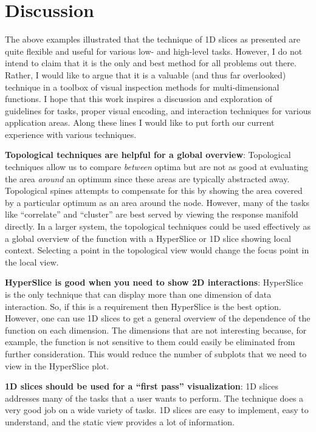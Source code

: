 
\section{Discussion}

The above examples illustrated that the technique of 1D slices as presented are
quite flexible and useful for various low- and high-level tasks.  However, I do
not intend to claim that it is the only and best method for all problems out
there. Rather, I would like to argue that it is a valuable (and thus far
overlooked) technique in a toolbox of visual inspection methods for
multi-dimensional functions. I hope that this work inspires a discussion and
exploration of guidelines for tasks, proper visual encoding, and interaction
techniques for various application areas. Along these lines I would like to put
forth our current experience with various techniques.

\textbf{Topological techniques are helpful for a global overview}: Topological
techniques allow us to compare \emph{between} optima but are not as good at
evaluating the area \emph{around} an optimum since these areas are typically
abstracted away.  Topological spines attempts to compensate for this by showing
the area covered by a particular optimum as an area around the node. However,
many of the tasks like ``correlate'' and ``cluster'' are best served by viewing
the response manifold directly. In a larger system, the topological techniques
could be used effectively as a global overview of the function with a
HyperSlice or 1D slice showing local context. Selecting a point in the
topological view would change the focus point in the local view.

\textbf{HyperSlice is good when you need to show 2D interactions}: HyperSlice
is the only technique that can display more than one dimension of data
interaction.  So, if this is a requirement then HyperSlice is the best option.
However, one can use 1D slices to get a general overview of the dependence of
the function on each dimension. The dimensions that are not interesting
because, for example, the function is not sensitive to them could easily be
eliminated from further consideration. This would reduce the number of subplots
that we need to view in the HyperSlice plot.

\textbf{1D slices should be used for a ``first pass'' visualization}: 1D slices
addresses many of the tasks that a user wants to perform. The technique does a
very good job on a wide variety of tasks. 1D slices are easy to
implement, easy to understand, and the static view provides a lot of
information.

